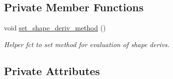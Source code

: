 \subsection*{Private Member Functions}
\begin{DoxyCompactItemize}
\item 
void \hyperlink{classRefineableFishPoissonProblem_a122cddf55249eaf0ee813818ff101fb4}{set\+\_\+shape\+\_\+deriv\+\_\+method} ()
\begin{DoxyCompactList}\small\item\em Helper fct to set method for evaluation of shape derivs. \end{DoxyCompactList}\end{DoxyCompactItemize}
\subsection*{Private Attributes}
